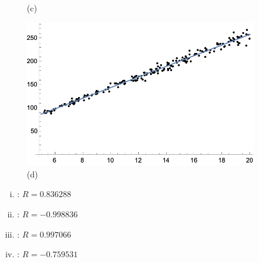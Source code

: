 \documentclass[11pt,letterpaper]{article}
\begin{document}
\begin{figure}[!ht]
\begin{minipage}{0.45\textwidth}
	   \caption*{(c)}
	\end{minipage}
	\begin{minipage}{0.45\textwidth}
	   \centering
	   \includegraphics[width=0.9\textwidth]{reg4.png}
	   \caption*{(d)}
	\end{minipage}
	\end{figure}

\begin{enumerate}[(i)]
\item \usol{0.5cm}{}: $R= 0.836288$
\item \usol{0.5cm}{}: $R= -0.998836$
\item \usol{0.5cm}{}: $R= 0.997066$
\item\usol{0.5cm}{}: $R= -0.759531$
\end{enumerate} 
\end{document}
